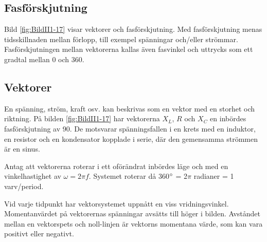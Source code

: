 \subsection{Fasförskjutning}


Bild \ref{fig:BildII1-17} visar vektorer och fasförskjutning.
Med fasförskjutning menas tidsskillnaden mellan förlopp, till exempel spänningar
och/eller strömmar.
Fasförskjutningen mellan vektorerna kallas även fasvinkel och uttrycks som ett
gradtal mellan 0 och 360\degree.

\subsection{Vektorer}

En spänning, ström, kraft osv. kan beskrivas som en vektor med en storhet och
riktning.
På bilden \ref{fig:BildII1-17} har vektorerna \(X_L\), \(R\) och \(X_C\) en
inbördes fasförskjutning av 90\degree.
De motsvarar spänningsfallen i en krets med en induktor, en resistor och en
kondensator kopplade i serie, där den gemensamma strömmen är en sinus.

Antag att vektorerna roterar i ett oförändrat inbördes läge och med en
vinkelhastighet av \(\omega= 2\pi f\).
Systemet roterar då 360\(\degree\) = 2\(\pi\) radianer = 1 varv/per\-iod.

Vid varje tidpunkt har vektorsystemet uppnått en viss vridningsvinkel.
Momentanvärdet på vektorernas spänningar avsätts till höger i bilden.
Avståndet mellan en vektorspets och noll-linjen är vektorns momentana värde,
som kan vara positivt eller negativt.
